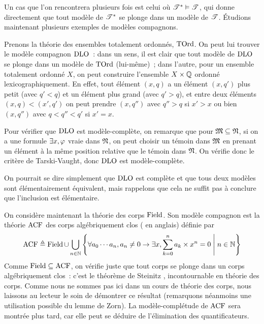 Un cas que l'on rencontrera plusieurs fois est celui où $\mathscr T^*\vDash\mathscr T$, qui
donne directement que tout modèle de $\mathscr T^*$ se plonge dans un modèle de
$\mathscr T$. \'Etudions maintenant plusieurs exemples de modèles compagnons.

\begin{example}
  Prenons la théorie des ensembles totalement ordonnés, $\operatorname{TOrd}$. On peut lui
  trouver le modèle compagnon $\operatorname{DLO}$~: dans un sens, il est clair que tout
  modèle de $\operatorname{DLO}$ se plonge dans un modèle de $\operatorname{TOrd}$ (lui-même)~; dans
  l'autre, pour un ensemble totalement ordonné $X$, on peut construire
  l'ensemble $X\times\mathbb Q$ ordonné lexicographiquement. En effet, tout élément
  $(x,q)$ a un élément $(x,q')$ plus petit (avec $q' < q$) et un élément plus
  grand (avec $q' > q$), et entre deux éléments $(x,q) < (x',q')$ on peut
  prendre $(x,q'')$ avec $q'' > q$ si $x' > x$ ou bien $(x,q'')$ avec
  $q < q'' < q'$ si $x' = x$.

  Pour vérifier que $\operatorname{DLO}$ est modèle-complète, on remarque que pour
  $\mathfrak{M}\subseteq\mathfrak{N}$, si on a une formule $\exists x,\varphi$ vraie
  dans $\mathfrak{N}$, on peut choisir un témoin dans $\mathfrak{M}$ en prenant un élément
  à la même position relative que le témoin dans $\mathfrak{N}$. On vérifie donc le
  critère de Tarski-Vaught, donc $\operatorname{DLO}$ est modèle-complète.
\end{example}

\begin{remark}
  On pourrait se dire simplement que $\operatorname{DLO}$ est complète et que tous deux
  modèles sont élémentairement équivalent, mais rappelons que cela ne suffit pas
  à conclure que l'inclusion est élémentaire.
\end{remark}

\begin{example}
  On considère maintenant la théorie des corps $\operatorname{Field}$. Son modèle compagnon
  est la théorie $\operatorname{ACF}$ des corps algébriquement clos
  ( en anglais) définie par
  \[\operatorname{ACF} \triangleq \operatorname{Field}\cup\bigcup_{n \in \mathbb N}
  \left\{ \forall a_0\cdots a_n, a_n\neq 0 \to \exists x,
    \sum_{k = 0}^n a_k\times x^n = 0 \;\middle\vert\; n \in \mathbb N \right\}\]
  Comme $\operatorname{Field}\subseteq\operatorname{ACF}$, on vérifie juste que tout corps se plonge dans
  un corps algébriquement clos~: c'est le théorème de Steinitz
  \cite{Steinitz1910}, incontournable en théorie des corps. Comme nous ne
  sommes pas ici dans un cours de théorie des corps, nous laissons au lecteur
  le soin de démontrer ce résultat (remarquons néanmoins une utilisation
  possible du lemme de Zorn). La modèle-complétude de $\operatorname{ACF}$ sera montrée plus
  tard, car elle peut se déduire de l'élimination des quantificateurs.
\end{example}

